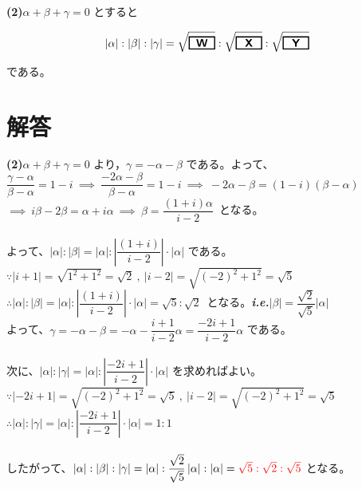 \documentclass[dvipdfmx,a4paper,12pt]{jarticle}
\makeatletter
\newcommand*{\ie}{\textbf{\textit{i.e.}}\@\xspace}
\theoremstyle{mystyle}
\newcommand{\ab}[1]{%
\begin{tikzpicture}[baseline]
\node[draw=black, 
      rectangle, 
      minimum width=0.8cm, 
      minimum height=0.3cm, 
      font=\bfseries,
      line width=1pt,
      inner sep=2pt,
      anchor=base] {$#1$};
\end{tikzpicture}%
}
\makeatother
\begin{document}
\textbf{(2)}\quad $\alpha + \beta + \gamma = 0$ とすると

$$|\alpha| : |\beta| : |\gamma| = \sqrt{\ab{\textsf W}} : \sqrt{\ab{\textsf X}} : \sqrt{\ab{\textsf Y}}$$

である。
\newpage
\section*{\textbf{解答}}
\noindent
\textbf{(2)}\quad $\alpha + \beta + \gamma = 0$ より，$\gamma = -\alpha - \beta$ である。よって、\\

\noindent
$\dfrac{\gamma - \alpha}{\beta - \alpha} = 1-i\ \implies\ \dfrac{-2\alpha-\beta}{\beta - \alpha} = 1-i\ \implies\ -2\alpha - \beta = (1-i)(\beta - \alpha)$\\

\noindent
$\implies\ i\beta-2\beta = \alpha +i \alpha\ \implies\ \beta = \dfrac{(1+i)\alpha}{i-2}$\ となる。\\
\\ 

\noindent
よって、$|\alpha|:|\beta|=\left| \alpha \right|:\left|\dfrac{(1+i)}{i-2}\right|\cdot \left|\alpha\right|$ である。\\

$\because \left| i+1 \right| = \sqrt{1^2 + 1^2}=\sqrt{2}\ ,\  \left| i-2 \right| = \sqrt{(-2)^2 + 1^2}=\sqrt{5}$ \\

$\therefore \left| \alpha \right|:\left| \beta \right|=\left| \alpha \right|:\left|\dfrac{(1+i)}{i-2}\right|\cdot\left|\alpha\right|=\sqrt{5}:\sqrt{2}$\ となる。\ie $\left| \beta \right|=\dfrac{\sqrt{2}}{\sqrt{5}}\left| \alpha \right|$ \\

\noindent
よって、$\gamma = -\alpha - \beta=-\alpha-\dfrac{i+1}{i-2} \alpha =\dfrac{-2i+1}{i-2} \alpha$ である。\\
\\

\noindent
次に、$\left| \alpha \right|:\left| \gamma \right|=\left| \alpha \right|:\left|\dfrac{-2i+1}{i-2}\right|\cdot\left|\alpha\right|$ を求めればよい。\\

$\because \left| -2i+1 \right| = \sqrt{(-2)^2 + 1^2}=\sqrt{5}\ ,\  \left| i-2 \right| = \sqrt{(-2)^2 + 1^2}=\sqrt{5}$\\

$\therefore \left| \alpha \right|:\left| \gamma \right|=\left| \alpha \right|:\left|\dfrac{-2i+1}{i-2}\right|\cdot\left|\alpha\right|=1:1$\\
\\

\noindent
したがって、$|\alpha|:|\beta|:|\gamma|=|\alpha|:\dfrac{\sqrt{2}}{\sqrt{5}}\left| \alpha \right|:|\alpha|=\color{red}\sqrt{5}:\sqrt{2}:\sqrt{5}$ となる。\\
\end{document}
